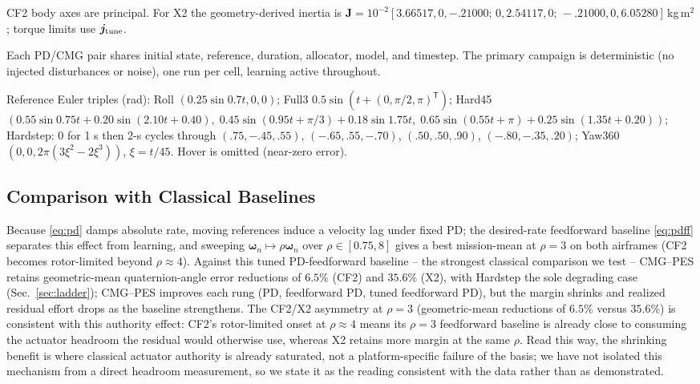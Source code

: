 \documentclass[letterpaper, 10 pt, conference]{ieeeconf}
\newcommand{\T}{^{\mathsf T}}
\begin{document}
CF2 body axes are principal. For X2 the geometry-derived inertia is
$\bm J=10^{-2}[3.66517,0,-.21000;\allowbreak\,0,2.54117,0;\allowbreak\,-.21000,0,6.05280]$\,kg\,m$^2$;
torque limits use $\bm j_{\rm tune}$.

Each PD/CMG pair shares initial state, reference, duration, allocator, model, and timestep. The primary campaign is deterministic (no injected disturbances or noise), one run per cell, learning active throughout.

Reference Euler triples (rad): Roll $(0.25\sin0.7t,0,0)$; Full3 $0.5\sin(t+(0,\pi/2,\pi)\T)$; Hard45
$(0.55\sin0.75t+0.20\sin(2.10t+0.40),\allowbreak\;0.45\sin(0.95t+\pi/3)+0.18\sin1.75t,\allowbreak\;0.65\sin(0.55t+\pi)+0.25\sin(1.35t+0.20))$;
Hardstep: $0$ for 1 s then 2-s cycles through $(.75,-.45,.55)$, $(-.65,.55,-.70)$, $(.50,.50,.90)$, $(-.80,-.35,.20)$;
Yaw360 $(0,0,2\pi(3\xi^2-2\xi^3))$, $\xi=t/45$. Hover is omitted (near-zero error).

\subsection{Comparison with Classical Baselines}
\label{sec:matrix}
Because \eqref{eq:pd} damps absolute rate, moving references induce a
velocity lag under fixed PD; the desired-rate feedforward baseline
\eqref{eq:pdff} separates this effect from learning, and sweeping
$\bm\omega_n\mapsto\rho\bm\omega_n$ over $\rho\in[0.75,8]$ gives a best
mission-mean at $\rho=3$ on both airframes (CF2 becomes rotor-limited
beyond $\rho\approx4$). Against this tuned PD-feedforward baseline -- the
strongest classical comparison we test -- CMG--PES retains geometric-mean
quaternion-angle error reductions of $6.5\%$ (CF2) and $35.6\%$ (X2), with
Hardstep the sole degrading case (Sec.~\ref{sec:ladder}); CMG--PES improves
each rung (PD, feedforward PD, tuned feedforward PD), but the margin
shrinks and realized residual effort drops as the baseline strengthens.
The CF2/X2 asymmetry at $\rho=3$ (geometric-mean reductions of $6.5\%$
versus $35.6\%$) is consistent with this authority effect: CF2's
rotor-limited onset at $\rho\approx4$ means its $\rho=3$ feedforward
baseline is already close to consuming the actuator headroom the residual
would otherwise use, whereas X2 retains more margin at the same $\rho$.
Read this way, the shrinking benefit is where classical actuator authority
is already saturated, not a platform-specific failure of the basis; we
have not isolated this mechanism from a direct headroom measurement, so we
state it as the reading consistent with the data rather than as
demonstrated.
\end{document}
